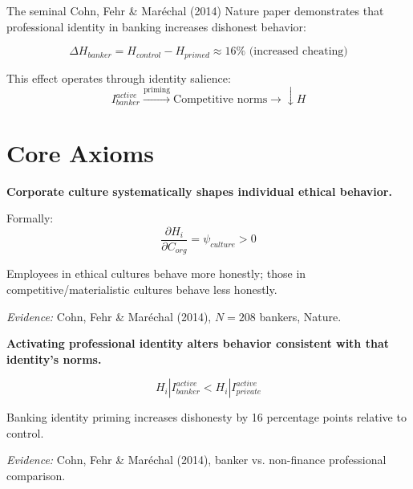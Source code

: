 The seminal Cohn, Fehr \& Maréchal (2014) Nature paper demonstrates that professional identity in banking increases dishonest behavior:

\begin{equation}
\Delta H_{banker} = H_{control} - H_{primed} \approx 16\% \text{ (increased cheating)}
\end{equation}

This effect operates through identity salience:
\begin{equation}
I_{banker}^{active} \xrightarrow{\text{priming}} \text{Competitive norms} \xrightarrow{} \downarrow H
\end{equation}

\section{Core Axioms}

\begin{tcolorbox}[colback=red!5!white,colframe=red!75!black,title=Axiom UNMAPPED_MM-1: Corporate Culture Effect]
\textbf{Corporate culture systematically shapes individual ethical behavior.}

Formally:
\begin{equation}
\frac{\partial H_i}{\partial C_{org}} = \psi_{culture} > 0
\end{equation}

Employees in ethical cultures behave more honestly; those in competitive/materialistic cultures behave less honestly.

\textit{Evidence:} Cohn, Fehr \& Maréchal (2014), $N=208$ bankers, Nature.
\end{tcolorbox}

\begin{tcolorbox}[colback=red!5!white,colframe=red!75!black,title=Axiom UNMAPPED_MM-2: Identity Priming Effect]
\textbf{Activating professional identity alters behavior consistent with that identity's norms.}

\begin{equation}
H_i | I_{banker}^{active} < H_i | I_{private}^{active}
\end{equation}

Banking identity priming increases dishonesty by 16 percentage points relative to control.

\textit{Evidence:} Cohn, Fehr \& Maréchal (2014), banker vs. non-finance professional comparison.
\end{tcolorbox}

